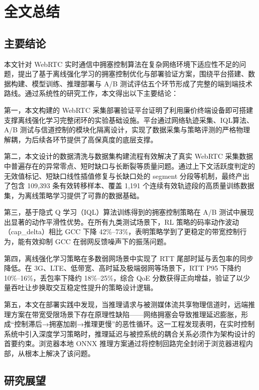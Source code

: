 
\chapter{全文总结}

\section{主要结论}

本文针对 WebRTC 实时通信中拥塞控制算法在复杂网络环境下适应性不足的问题，提出了基于离线强化学习的拥塞控制优化与部署验证方案，围绕平台搭建、数据构建、模型训练、推理部署与 A/B 测试评估五个环节形成了完整的端到端技术路线。通过系统性的研究工作，本文得出以下主要结论：

第一，本文构建的 WebRTC 采集部署验证平台证明了利用廉价终端设备即可搭建支撑离线强化学习完整闭环的实验基础设施。平台通过网络轨迹采集、IQL算法、A/B 测试与信道控制的模块化隔离设计，实现了数据采集与策略评测的严格物理解耦，为后续各环节提供了高保真度的底层支撑。

第二，本文设计的数据清洗与数据集构建流程有效解决了真实 WebRTC 采集数据中普遍存在的异常零点、短时缺口与长断裂等质量问题。通过上下文活跃度判定的无效值标记、短缺口线性插值修复与长缺口处的 segment 分段等机制，最终产出了包含 109,393 条有效转移样本、覆盖 1,191 个连续有效轨迹段的高质量训练数据集，为离线策略学习提供了可靠的数据基础。

第三，基于隐式 Q 学习（IQL）算法训练得到的拥塞控制策略在 A/B 测试中展现出显著的动作平滑性优势。在所有九类测试场景下，RL 策略的码率动作波动（cap\_delta）相比 GCC 下降 42\%--73\%，表明策略学到了更稳定的带宽控制行为，能有效抑制 GCC 在弱网反馈噪声下的振荡问题。

第四，离线强化学习策略在多数弱网场景中实现了 RTT 尾部时延与丢包率的同步降低。在 3G、LTE、低带宽、高时延及极端弱网等场景下，RTT P95 下降约 10\%--16\%，丢包率下降约 18\%--25\%，综合 QoE 分数获得正向增益，验证了以少量吞吐让步换取交互稳定性提升的策略设计逻辑。

第五，本文在部署实践中发现，当推理请求与被测媒体流共享物理信道时，远端推理方案在带宽受限场景下存在原理性缺陷——网络拥塞会导致推理延迟膨胀，形成“控制滞后→拥塞加剧→推理更慢”的恶性循环。这一工程发现表明，在实时控制系统中引入深度学习策略时，推理延迟与被控系统的耦合关系必须作为架构设计的首要约束。浏览器本地 ONNX 推理方案通过将控制回路完全封闭于浏览器进程内部，从根本上解决了该问题。

\section{研究展望}

